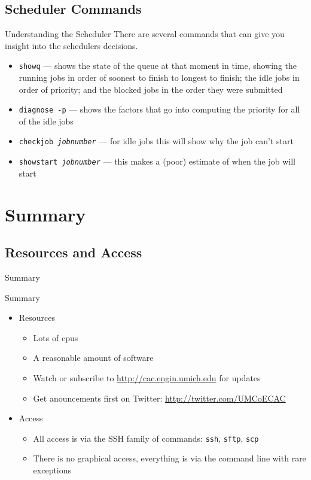 \documentclass[handout]{beamer}
\begin{document}
\subsection{Scheduler Commands}
\begin{frame}{Understanding the Scheduler}
There are several commands that can give you insight into the schedulers
decisions.
\begin{itemize}
\item \texttt{showq} --- shows the state of the queue at that moment in time,
showing the running jobs in order of soonest to finish to longest to finish; the
idle jobs in order of priority; and the blocked jobs in the order they were
submitted
\item \texttt{diagnose -p} --- shows the factors that go into computing the
priority for all of the idle jobs
\item \texttt{checkjob \textit{jobnumber}} --- for idle jobs this will show why
the job can't start
\item \texttt{showstart \textit{jobnumber}} --- this makes a (poor) estimate of
when the job will start
\end{itemize}
\end{frame}


\section{Summary}
\subsection{Resources and Access}
\begin{frame}{Summary}
 \begin{block}{Summary}
 \begin{itemize}
  \item Resources
   \begin{itemize}
    \item Lots of cpus
    \item A reasonable amount of software
    \item Watch or subscribe to \url{http://cac.engin.umich.edu} for updates
    \item Get anouncements first on Twitter: \url{http://twitter.com/UMCoECAC}
   \end{itemize}
   \item Access
    \begin{itemize}
     \item All access is via the SSH family of commands: \texttt{ssh},
\texttt{sftp}, \texttt{scp}
     \item There is no graphical access, everything is via the command line with rare exceptions
    \end{itemize}
 \end{itemize}
 \end{block}
\end{frame}
\end{document}
